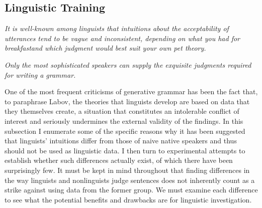 \subsection{ Linguistic Training} \label{sec:4.4.1}

\epigraph{\textit{It is well-known among linguists that intuitions about the acceptability of utterances tend to be vague and inconsistent, depending on what you had for breakfast}\footnotemark\textit{and which judgment  would best suit your own pet theory.\\[-2\baselineskip]}\footnotemark}{\citep{Dahl1979}}


\epigraph{\textit{Only the most sophisticated  speakers can supply the exquisite judgments  required for  writing a grammar.}\\[-2\baselineskip]}{\citep{GleitmanEtAl1970}}



\noindent One of the most frequent criticisms of generative grammar has been the fact that, to paraphrase Labov, the theories that linguists develop are based on data that they themselves create, a situation that constitutes an intolerable conflict of interest and seriously undermines the external validity of the findings. In this subsection I enumerate some of the specific reasons why it has been suggested that linguists' intuitions differ from those of naive native  speakers and thus should not be used as linguistic data. I then turn to experimental attempts to establish whether such differences actually exist, of which there have been surprisingly few. It must be kept in mind throughout that finding differences in the way linguists
and nonlinguists judge sentences does not inherently count as a strike against using data from the former group. We must examine each difference to see what the potential benefits and drawbacks are for linguistic investigation.

